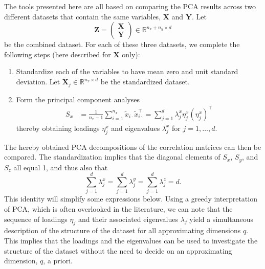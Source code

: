 \documentclass[a4paper,12pt]{article}
\newcommand{\RR}{\mathbb{R}}
\begin{document}
The tools presented here are all based on comparing the PCA results across two different datasets that contain the same variables, $\mathbf{X}$ and $\mathbf{Y}$. Let 
$$\mathbf{Z} = \begin{pmatrix} \mathbf{X} \\ \mathbf{Y} \end{pmatrix} \in \RR^{n_x + n_y \times d}$$
 be the combined dataset. For each of these three datasets, we complete the following steps (here described for $\mathbf{X}$ only):
\begin{enumerate}
\item Standardize each of the variables to have mean zero and unit standard deviation. Let $\tilde{\mathbf{X}}_{j} \in \RR^{n_x \times d}$ be the standardized dataset.
\item Form the principal component analyses
\begin{align*}
S_x &= \frac{1}{n_x-1} \sum_{i=1}^{n_x} \tilde{x}_{i \cdot} \tilde{x}_{i \cdot}^\top = \sum_{j=1}^d \lambda_{j}^x \eta_{j}^x ({\eta_{j}^x})^\top 
\end{align*}
thereby obtaining loadings $\eta_{j}^x$ and eigenvalues $\lambda^x_j$ for $j=1,\dotsc,d$.
\end{enumerate}
The hereby obtained PCA decompositions of the correlation matrices can then be compared. The standardization implies that the diagonal elements of $S_x$, $S_y$, and $S_z$ all equal 1, and thus also that
\begin{equation*}
\sum_{j=1}^d \lambda_j^x = \sum_{j=1}^d \lambda_{j}^y = \sum_{j=1}^d \lambda_{j}^z =  d.
\end{equation*}
This identity will simplify some expressions below. Using a greedy interpretation of PCA, which is often overlooked in the literature, we can note that the sequence of loadings $\eta_j$ and their associated eigenvalues $\lambda_j$ yield a simultaneous description of the structure of the dataset for all approximating dimensions $q$. This implies that the loadings and the eigenvalues can be used to investigate the structure of the dataset without the need to decide on an approximating dimension, $q$, a priori. 
\end{document}
